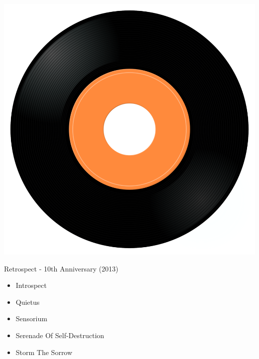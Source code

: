 \begin{minipage}[t]{0.25\textwidth}
\captionsetup{type=figure}
\includegraphics[width=\textwidth]{Images/cover.png}
\caption*{Retrospect - 10th Anniversary (2013)}
\end{minipage}
\begin{minipage}[t]{0.25\textwidth}\vspace{0pt}
\begin{itemize}[nosep,leftmargin=1em,labelwidth=*,align=left]
	\setlength{\itemsep}{0pt}
	\item Introspect
	\item Quietus
	\item Sensorium
	\item Serenade Of Self-Destruction
	\item Storm The Sorrow
\end{itemize}
\end{minipage}
